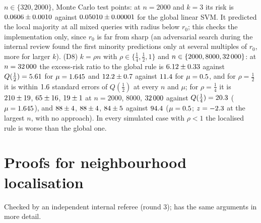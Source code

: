 \documentclass[11pt,a4paper]{article}
\theoremstyle{plain}
\theoremstyle{definition}
\theoremstyle{remark}
\begin{document}
$n\in\{320,2000\}$, Monte Carlo test points: at $n=2000$ and $k=3$ its risk is $0.0606\pm0.0010$ against $0.05010\pm0.00001$ for the global linear SVM. It predicted the local majority at all \KLMajChecked{} mixed queries with radius below $r_0$; this checks the implementation only, since $r_0$ is far from sharp (an adversarial search during the internal review found the first minority predictions only at several multiples of $r_0$, more for larger $k$). (D8) $k=\rho n$ with $\rho\in\{\tfrac14,\tfrac12,1\}$ and $n\in\{2000,8000,32\,000\}$: at $n=32\,000$ the excess-risk ratio to the global rule is $6.12\pm0.33$ against $Q(\tfrac12)=5.61$ for $\mu=1.645$ and $12.2\pm0.7$ against $11.4$ for $\mu=0.5$, and for $\rho=\tfrac12$ it is within $1.6$ standard errors of $Q(\tfrac12)$ at every $n$ and $\mu$; for $\rho=\tfrac14$ it is $210\pm19$, $65\pm16$, $19\pm1$ at $n=2000$, $8000$, $32\,000$ against $Q(\tfrac14)=20.3$ ($\mu=1.645$), and $88\pm4$, $88\pm4$, $84\pm5$ against $94.4$ ($\mu=0.5$; $z=-2.3$ at the largest $n$, with no approach). In every simulated case with $\rho<1$ the localised rule is worse than the global one.


\section{Proofs for neighbourhood localisation}\label{app:knnproofs}
Checked by an independent internal referee (round 3);  has the same arguments in more detail.
\end{document}
